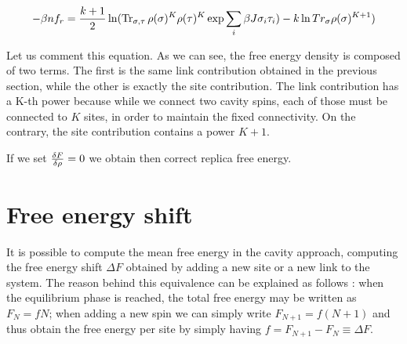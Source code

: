 \begin{equation}
-\beta n f_r = {k+1\over2}\ln(\operatorname{Tr}_{\sigma,\tau} \rho(\sigma)^K\rho(\tau)^K \exp\sum_i \beta J \sigma_i \tau_i) -
k \ln Tr_\sigma \rho(\sigma)^{K+1})
\end{equation}

Let us comment this equation. As we can see, the free energy density is composed of two terms. The first is the same link contribution obtained in the previous section, while the other is exactly the site contribution. The link contribution has a K-th power because while we connect two cavity spins, each of those must be connected to $K$ sites, in order to maintain the fixed connectivity. On the contrary, the site contribution contains a power $K+1$.

If we set ${\delta F \over \delta \rho} = 0$ we obtain then correct replica free energy.

\section{Free energy shift}

It is possible to compute the mean free energy in the cavity approach, computing the free energy shift $\Delta F$ obtained by adding a new site or a new link to the system. The reason behind this equivalence can be explained as follows \cite{enzo}: when the equilibrium phase is reached, the total free energy may be written as $F_N = fN$; when adding a new spin we can simply write $F_{N+1} = f(N+1)$ and thus obtain the free energy per site by simply having $f = F_{N+1} - F_N \equiv \Delta F$.

